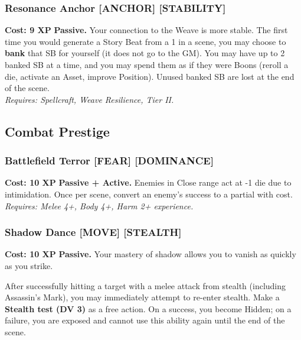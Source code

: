 \subsubsection*{Resonance Anchor \textnormal{[ANCHOR] [STABILITY]}}
\label{talent:resonance-anchor}
\textbf{Cost: 9 XP} \textbf{Passive.} Your connection to the Weave is more stable. The first time you would generate a Story Beat from a 1 in a scene, you may choose to \textbf{bank} that SB for yourself (it does not go to the GM). You may have up to 2 banked SB at a time, and you may spend them as if they were Boons (reroll a die, activate an Asset, improve Position). Unused banked SB are lost at the end of the scene. \\
\textit{Requires: Spellcraft, Weave Resilience, Tier II.}

\subsection*{Combat Prestige}
\label{sec:prestige-combat}

\subsubsection*{Battlefield Terror \textnormal{[FEAR] [DOMINANCE]}}
\label{talent:battlefield-terror}
\textbf{Cost: 10 XP} \textbf{Passive + Active.} Enemies in Close range act at -1 die due to intimidation. Once per scene, convert an enemy's success to a partial with cost. \\
\textit{Requires: Melee 4+, Body 4+, Harm 2+ experience.}

\subsubsection*{Shadow Dance \textnormal{[MOVE] [STEALTH]}}
\label{talent:shadow-dance}
\textbf{Cost: 10 XP} \textbf{Passive.} Your mastery of shadow allows you to vanish as quickly as you strike.

After successfully hitting a target with a melee attack from stealth (including Assassin's Mark), you may immediately attempt to re-enter stealth. Make a \textbf{Stealth test (DV 3)} as a free action. On a success, you become Hidden; on a failure, you are exposed and cannot use this ability again until the end of the scene.

